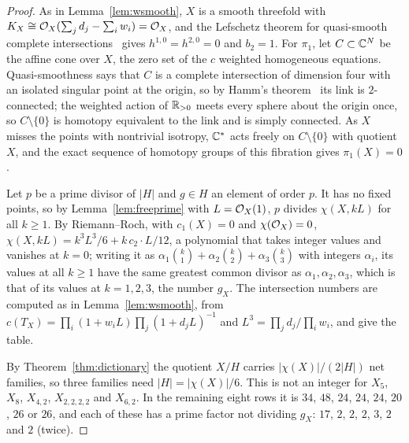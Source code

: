 \begin{proof}
As in Lemma~\ref{lem:wsmooth}, $X$ is a smooth threefold with $K_X\cong
\mathcal{O}_X(\sum_jd_j-\sum_iw_i)=\mathcal{O}_X$, and the Lefschetz theorem for
quasi-smooth complete intersections~\cite{Dol82} gives $h^{1,0}=h^{2,0}=0$
and $b_2=1$. For $\pi_1$, let $C\subset\mathbb{C}^{N}$ be the affine cone over $X$,
the zero set of the $c$ weighted homogeneous equations. Quasi-smoothness
says that $C$ is a complete intersection of dimension four with an isolated
singular point at the origin, so by Hamm's theorem~\cite{Ham71} its link
is $2$-connected; the weighted action of $\mathbb{R}_{>0}$ meets every sphere about
the origin once, so $C\setminus\{0\}$ is homotopy equivalent to the link and
is simply connected. As $X$ misses the points with nontrivial isotropy,
$\mathbb{C}^*$ acts freely on $C\setminus\{0\}$ with quotient $X$, and the exact
sequence of homotopy groups of this fibration gives $\pi_1(X)=0$.

Let $p$ be a prime divisor of $|H|$ and $g\in H$ an element of order $p$.
It has no fixed points, so by Lemma~\ref{lem:freeprime} with
$L=\mathcal{O}_X(1)$, $p$ divides $\chi(X,kL)$ for all $k\ge1$. By Riemann--Roch,
with $c_1(X)=0$ and $\chi(\mathcal{O}_X)=0$,
$\chi(X,kL)=k^3L^3/6+k\,c_2\cdot L/12$, a polynomial that takes integer
values and vanishes at $k=0$; writing it as $\alpha_1\binom k1+\alpha_2
\binom k2+\alpha_3\binom k3$ with integers $\alpha_i$, its values at all
$k\ge1$ have the same greatest common divisor as $\alpha_1,\alpha_2,
\alpha_3$, which is that of its values at $k=1,2,3$, the number $g_X$. The
intersection numbers are computed as in Lemma~\ref{lem:wsmooth}, from
$c(T_X)=\prod_i(1+w_iL)\prod_j(1+d_jL)^{-1}$ and
$L^3=\prod_jd_j/\prod_iw_i$, and give the table.

By Theorem~\ref{thm:dictionary} the quotient $X/H$ carries
$|\chi(X)|/(2|H|)$ net families, so three families need
$|H|=|\chi(X)|/6$. This is not an integer for $X_5$, $X_8$, $X_{4,2}$,
$X_{2,2,2,2}$ and $X_{6,2}$. In the remaining eight rows it is $34$, $48$,
$24$, $24$, $24$, $20$, $26$ or $26$, and each of these has a prime factor
not dividing $g_X$: $17$, $2$, $2$, $2$, $3$, $2$ and $2$ (twice).
\end{proof}

